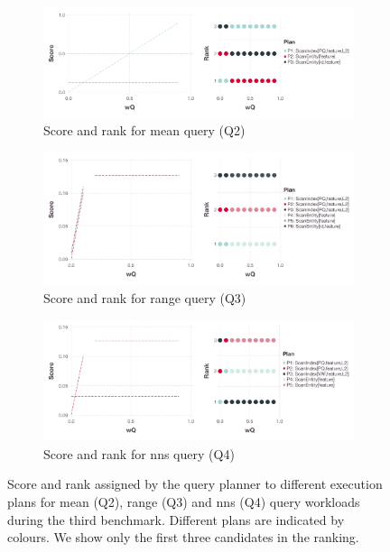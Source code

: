 \begin{figure}[p]
    \centering
    \begin{subfigure}[b]{\textwidth}
        \centering
        \includegraphics[width=\textwidth]{figures/analytics/analytics-cottontail-cost-mean}
        \caption{Score and rank for mean query (Q2)}
        \label{figure:cottontail_analytics_cost_mean}
    \end{subfigure}
    \hfill
    \centering
    \begin{subfigure}[b]{\textwidth}
        \centering
        \includegraphics[width=\textwidth]{figures/analytics/analytics-cottontail-cost-range}
        \caption{Score and rank for range query (Q3)}
        \label{figure:cottontail_analytics_cost_range}
    \end{subfigure}
    \hfill
    \centering
    \begin{subfigure}[b]{\textwidth}
        \centering
        \includegraphics[width=\textwidth]{figures/analytics/analytics-cottontail-cost-nns}
        \caption{Score and rank for \acrshort{nns} query (Q4)}
        \label{figure:cottontail_analytics_cost_nns}
    \end{subfigure}
    \caption{Score and rank assigned by the query planner to different execution plans for mean (Q2), range (Q3) and \acrshort{nns} (Q4) query workloads during the third benchmark. Different plans are indicated by colours. We show only the first three candidates in the ranking.}
    \label{figure:cottontail_analytics_costs}
\end{figure}

